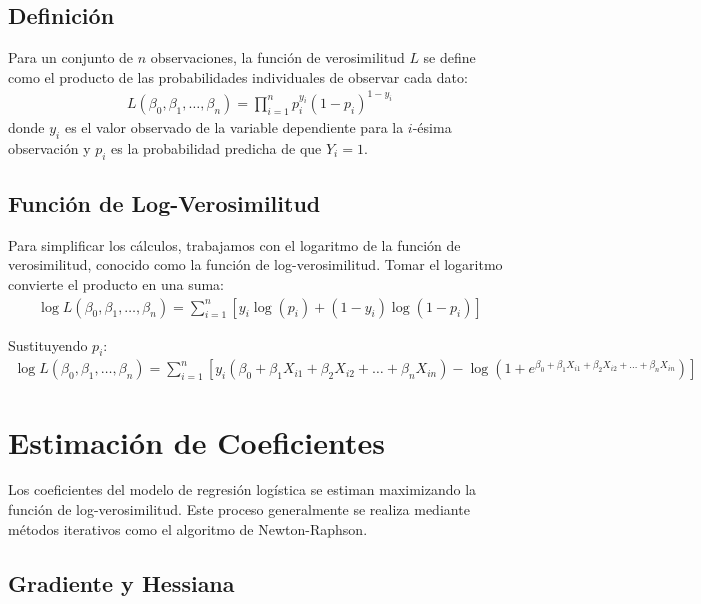 \documentclass[a4paper]{report} %
\begin{document}
\subsection{Definici\'on}

Para un conjunto de $n$ observaciones, la funci\'on de verosimilitud $L$ se define como el producto de las probabilidades individuales de observar cada dato:
\begin{eqnarray*}
L(\beta_0, \beta_1, \ldots, \beta_n) = \prod_{i=1}^{n} p_i^{y_i} (1 - p_i)^{1 - y_i}
\end{eqnarray*}
donde $y_i$ es el valor observado de la variable dependiente para la $i$-\'esima observaci\'on y $p_i$ es la probabilidad predicha de que $Y_i = 1$.

\subsection{Funci\'on de Log-Verosimilitud}

Para simplificar los c\'alculos, trabajamos con el logaritmo de la funci\'on de verosimilitud, conocido como la funci\'on de log-verosimilitud. Tomar el logaritmo convierte el producto en una suma:
\begin{eqnarray*}
\log L(\beta_0, \beta_1, \ldots, \beta_n) = \sum_{i=1}^{n} \left[ y_i \log(p_i) + (1 - y_i) \log(1 - p_i) \right]
\end{eqnarray*}

Sustituyendo $p_i$:
\begin{eqnarray*}
\log L(\beta_0, \beta_1, \ldots, \beta_n) = \sum_{i=1}^{n} \left[ y_i (\beta_0 + \beta_1 X_{i1} + \beta_2 X_{i2} + \ldots + \beta_n X_{in}) - \log(1 + e^{\beta_0 + \beta_1 X_{i1} + \beta_2 X_{i2} + \ldots + \beta_n X_{in}}) \right]
\end{eqnarray*}

\section{Estimaci\'on de Coeficientes}

Los coeficientes del modelo de regresi\'on log\'istica se estiman maximizando la funci\'on de log-verosimilitud. Este proceso generalmente se realiza mediante m\'etodos iterativos como el algoritmo de Newton-Raphson.

\subsection{Gradiente y Hessiana}
\end{document}
